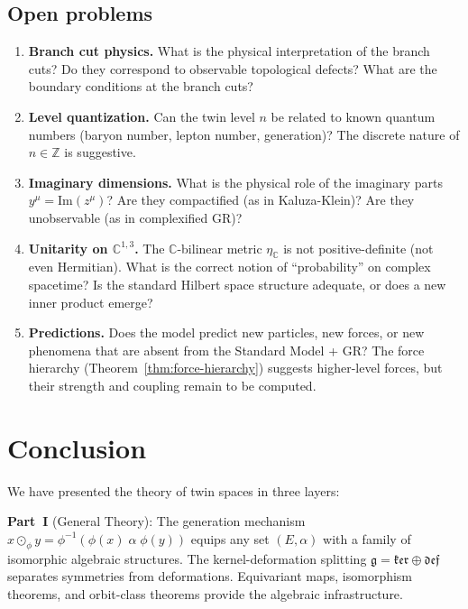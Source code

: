 \documentclass[12pt]{article}
\theoremstyle{plain}
\theoremstyle{definition}
\theoremstyle{remark}
\newcommand{\CC}{\mathbb{C}}
\newcommand{\ZZ}{\mathbb{Z}}
\begin{document}
\subsection{Open problems}

\begin{enumerate}[label=(\roman*)]
    \item \textbf{Branch cut physics.} What is the physical interpretation of the branch cuts? Do they correspond to observable topological defects? What are the boundary conditions at the branch cuts?
    
    \item \textbf{Level quantization.} Can the twin level $n$ be related to known quantum numbers (baryon number, lepton number, generation)? The discrete nature of $n \in \ZZ$ is suggestive.
    
    \item \textbf{Imaginary dimensions.} What is the physical role of the imaginary parts $y^\mu = \mathrm{Im}(z^\mu)$? Are they compactified (as in Kaluza-Klein)? Are they unobservable (as in complexified GR)?
    
    \item \textbf{Unitarity on $\CC^{1,3}$.} The $\CC$-bilinear metric $\eta_\CC$ is not positive-definite (not even Hermitian). What is the correct notion of ``probability'' on complex spacetime? Is the standard Hilbert space structure adequate, or does a new inner product emerge?
    
    \item \textbf{Predictions.} Does the model predict new particles, new forces, or new phenomena that are absent from the Standard Model + GR? The force hierarchy (Theorem~\ref{thm:force-hierarchy}) suggests higher-level forces, but their strength and coupling remain to be computed.
\end{enumerate}


\section{Conclusion}
\label{sec:conclusion}

We have presented the theory of twin spaces in three layers:

\textbf{Part~I} (General Theory): The generation mechanism $x \odot_\phi y = \phi^{-1}(\phi(x) \;\alpha\; \phi(y))$ equips any set $(E, \alpha)$ with a family of isomorphic algebraic structures. The kernel-deformation splitting $\mathfrak{g} = \mathfrak{ker} \oplus \mathfrak{def}$ separates symmetries from deformations. Equivariant maps, isomorphism theorems, and orbit-class theorems provide the algebraic infrastructure.
\end{document}
